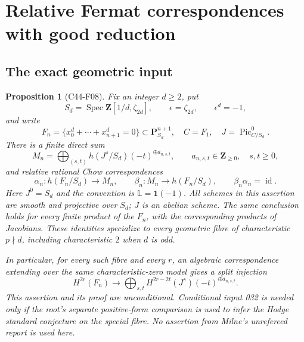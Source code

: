 \documentclass[11pt]{article}
\newtheorem{proposition}[theorem]{Proposition}
\theoremstyle{remark}\newtheorem{remark}[theorem]{Remark}
\begin{document}
\section{Relative Fermat correspondences with good reduction}

\subsection{The exact geometric input}

\begin{proposition}[C44-F08]\label{C44-F08}
Fix an integer $d\geq2$, put
\[
 S_d=\operatorname{Spec}\mathbf Z[1/d,\zeta_{2d}],\qquad
 \epsilon=\zeta_{2d},\qquad \epsilon^d=-1,
\]
and write
\[
 F_n=\{x_0^d+\cdots+x_{n+1}^d=0\}\subset\mathbf P^{n+1}_{S_d},
 \quad C=F_1,\quad J=\operatorname{Pic}^0_{C/S_d}.
\]
There is a finite direct sum
\[
 M_n=\bigoplus_{(s,t)}h(J^{s}/S_d)(-t)^{\oplus a_{n,s,t}},
 \qquad a_{n,s,t}\in\mathbf Z_{\geq0},\quad s,t\geq0,
 \tag{F08.1}
\]
and relative rational Chow correspondences
\[
 \alpha_n:h(F_n/S_d)\longrightarrow M_n,
 \qquad
 \beta_n:M_n\longrightarrow h(F_n/S_d),\qquad
 \beta_n\alpha_n=\operatorname{id}.
 \tag{F08.2}
\]
Here $J^0=S_d$ and the convention is
$\mathbb L=\mathbf1(-1)$. All schemes in this assertion are smooth
and projective over $S_d$; $J$ is an abelian scheme. The same conclusion
holds for every finite product of the $F_n$, with the corresponding
products of Jacobians. These identities specialize to every geometric
fibre of characteristic $p\nmid d$, including characteristic $2$
when $d$ is odd.

In particular, for every such fibre and every $r$, an algebraic
correspondence extending over the same characteristic-zero model gives
a split injection
\[
 H^{2r}(F_n)\longrightarrow
 \bigoplus_{s,t}H^{2r-2t}(J^s)(-t)^{\oplus a_{n,s,t}}.
 \tag{F08.3}
\]
This assertion and its proof are unconditional. Conditional input 032
is needed only if the root's separate positive-form comparison is
used to infer the Hodge standard conjecture on the special fibre.
No assertion from Milne's unrefereed report is used here.
\end{proposition}
\end{document}
